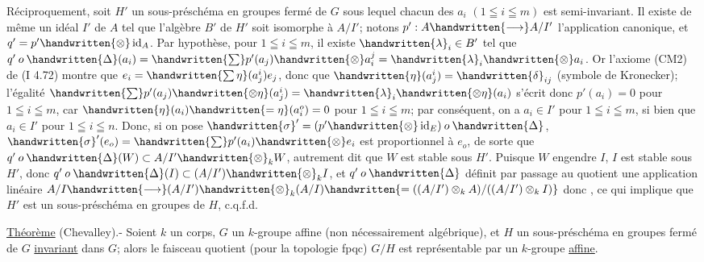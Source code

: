 Réciproquement, soit $H'$ un sous-préschéma en groupes fermé de $G$ sous lequel chacun des $a_i$ $(1\leqq i\leqq m)$ est semi-invariant.  Il existe de même un idéal $I'$ de $A$ tel que l'algèbre $B'$ de $H'$ soit isomorphe à $A/I'$; notons $p':A\handwritten{\longrightarrow}A/I'$ l'application canonique, et $q'=p'\handwritten{\otimes}\operatorname{id}_A$. Par hypothèse, pour $1\leqq i\leqq m$, il existe $\handwritten{\lambda}_i\in B'$ tel que $q'\mathbin{o}\handwritten{\Delta}(a_i)=\handwritten{\sum}p'(a_j)\handwritten{\otimes}a_i^j=\handwritten{\lambda}_i\handwritten{\otimes}a_i$. Or l'axiome (CM2) de (I 4.72) montre que $e_i=\handwritten{\sum\eta}(a_j^i)e_j$, donc que $\handwritten{\eta}(a_j^i)=\handwritten{\delta}_{ij}$ (symbole de Kronecker); l'égalité $\handwritten{\sum}p'(a_j)\handwritten{\otimes\eta}(a_j^i)=\handwritten{\lambda}_i\handwritten{\otimes\eta}(a_i)$ s'écrit donc $p'(a_i)=0$ pour $1\leqq i\leqq m$, car $\handwritten{\eta}(a_i)\handwritten{=\eta}(a_i^o)=0$ pour $1\leqq i\leqq m$; par conséquent, on a $a_i\in I'$ pour $1\leqq i\leqq m$, si bien que $a_i\in I'$ pour $1\leqq i\leqq n$. Donc, si on pose $\handwritten{\sigma}'=(p'\handwritten{\otimes}\operatorname{id}_E)\mathbin{o}\handwritten{\Delta}$, $\handwritten{\sigma}'(e_o)=\handwritten{\sum}p'(a_i)\handwritten{\otimes}e_i$ est proportionnel à $e_o$, de sorte que $q'\mathbin{o}\handwritten{\Delta}(W)\subset A/I'\handwritten{\otimes}_k W$, autrement dit que $W$ est stable sous $H'$. Puisque $W$ engendre $I$, $I$ est stable sous $H'$, donc $q'\mathbin{o}\handwritten{\Delta}(I)\subset(A/I')\handwritten{\otimes}_k I$, et $q'\mathbin{o}\handwritten{\Delta}$ définit par passage au quotient une application linéaire $A/I\handwritten{\longrightarrow}(A/I')\handwritten{\otimes}_k(A/I)\handwritten{=((A/I')\otimes_k A)/((A/I')\otimes_k I)}$ donc , ce qui implique que $H'$ est  un sous-préschéma en groupes de $H$, c.q.f.d.

\uline{Théorème}  (Chevalley).- Soient $k$ un corps, $G$ un $k$-groupe affine (non nécessairement algébrique), et $H$ un sous-préschéma en groupes fermé de $G$ \uline{invariant} dans $G$; alors le faisceau quotient (pour la topologie fpqc) $G/H$ est représentable par un $k$-groupe \uline{affine}.

